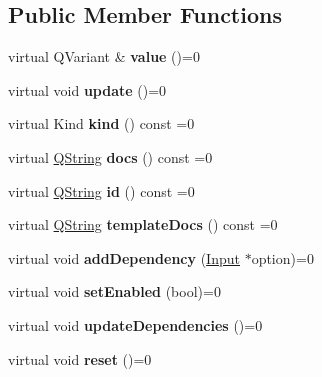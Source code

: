 \subsection*{Public Member Functions}
\begin{DoxyCompactItemize}
\item 
\mbox{\label{class_input_a72c6ccd2eff708b1f91b8503427ec312}} 
virtual Q\+Variant \& {\bfseries value} ()=0
\item 
\mbox{\label{class_input_a0436098ba644b5a7f643dd0c2d33d26a}} 
virtual void {\bfseries update} ()=0
\item 
\mbox{\label{class_input_a18b8ea0727d09d038f5519331935234d}} 
virtual Kind {\bfseries kind} () const =0
\item 
\mbox{\label{class_input_acc40a0e9b7242f8224af67018eca0179}} 
virtual \mbox{\hyperlink{class_q_string}{Q\+String}} {\bfseries docs} () const =0
\item 
\mbox{\label{class_input_a38ffc759dead04345c9fdb2cf3fc5086}} 
virtual \mbox{\hyperlink{class_q_string}{Q\+String}} {\bfseries id} () const =0
\item 
\mbox{\label{class_input_a27c3791a291f69467bc786760f74d01c}} 
virtual \mbox{\hyperlink{class_q_string}{Q\+String}} {\bfseries template\+Docs} () const =0
\item 
\mbox{\label{class_input_ac7db8341f42bd6313fc5370f8dea0394}} 
virtual void {\bfseries add\+Dependency} (\mbox{\hyperlink{class_input}{Input}} $\ast$option)=0
\item 
\mbox{\label{class_input_a29e1927059a522781963fc8d0a872822}} 
virtual void {\bfseries set\+Enabled} (bool)=0
\item 
\mbox{\label{class_input_a8758a9e88aecbbd9be1d438ba5b8454c}} 
virtual void {\bfseries update\+Dependencies} ()=0
\item 
\mbox{\label{class_input_a2456add66c0c39982467a6a376c057fb}} 
virtual void {\bfseries reset} ()=0
\item 

\end{DoxyCompactItemize}
